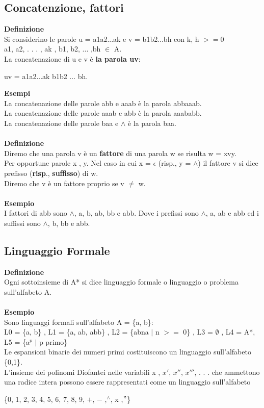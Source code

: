 \subsection{Concatenzione, fattori}
\textbf{Definizione}\\
Si considerino le parole u = a1a2...ak e v = b1b2...bh con k, h $>= 0$ \\
a1, a2, . . . , ak , b1, b2, ... ,bh $\in$ A.\\
La concatenazione di u e v è \textbf{la parola uv}:\\
\begin{center}
uv = a1a2...ak b1b2 ... bh.    
\end{center}
\textbf{Esempi}\\
La concatenazione delle parole abb e aaab è la parola abbaaab.\\
La concatenazione delle parole aaab e abb è la parola aaababb.\\
La concatenazione delle parole baa e $\wedge$ è la parola baa.\\\\ 
\textbf{Definizione}\\
Diremo che una parola v è un \textbf{fattore} di una parola w se risulta w = xvy.\\
Per opportune parole x , y. Nel caso in cui x = $\epsilon$ (risp., y = $\wedge$) il fattore v si dice 
prefisso (\textbf{risp}., \textbf{suffisso}) di w.\\ 
Diremo che v è un fattore proprio se v $\neq$ w.\\\\
\textbf{Esempio}\\
I fattori di abb sono $\wedge$, a, b, ab, bb e abb. Dove i prefissi sono $\wedge$, a, ab e abb ed i suffissi sono  $\wedge$, b, bb e abb.
\subsection{Linguaggio Formale}
\textbf{Definizione}\\
Ogni sottoinsieme di A* si dice linguaggio formale o linguaggio o problema sull’alfabeto A.\\\\
\textbf{Esempio}\\
Sono linguaggi formali sull’alfabeto A = \{a, b\}:\\
L0 = \{a, b\} , L1 = \{a, ab, abb\} , L2 = \{abna $|$ n $>=$ 0\} , L3 = $\emptyset$ , L4 = A*,\\L5 = \{a$^p$ $|$ p primo\}\\
Le espansioni binarie dei numeri primi costituiscono un linguaggio sull’alfabeto \{0,1\}.\\
L’insieme dei polinomi Diofantei nelle variabili x , $x'$, $x''$, $x'''$, . . . che ammettono una radice intera possono essere rappresentati come un linguaggio sull’alfabeto
\begin{center}
\{0, 1, 2, 3, 4, 5, 6, 7, 8, 9, $+$, $-$ ,$^\wedge$, x ,$"$\}
\end{center}

